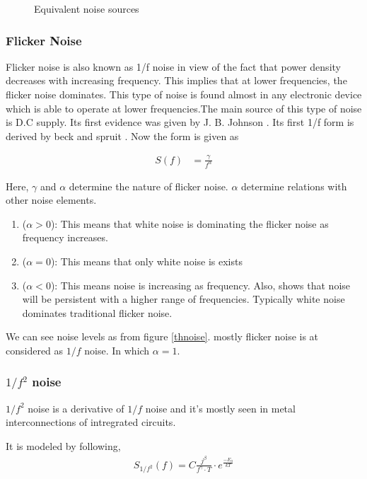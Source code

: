 \begin{figure}[hbt!]
\caption{Equivalent noise sources}
\end{figure}

\subsubsection{Flicker Noise \label{thflicker}}

Flicker noise is also known as 1/f noise in view of the fact that power density decreases with increasing frequency. This implies that at lower frequencies, the flicker noise dominates.
This type of noise is found  almost in any electronic device which is able to operate at lower frequencies.The main source of this type of noise is D.C supply. Its first evidence was given by J. B. Johnson \cite{johnson1925schottky}. Its first 1/f form is derived by beck and spruit \cite{beck19781}. Now the form is given as 

\begin{align}
S(f) & = \frac{\gamma}{f^{\alpha}}
\end{align}

Here, $\gamma$ and $\alpha$ determine the nature of flicker noise. $\alpha$ determine relations with other noise elements.

\begin{enumerate}
\item ($\alpha > 0$): This means that white noise is dominating the flicker noise as frequency increases.
\item ($\alpha = 0$): This means that only white noise is exists
\item ($\alpha < 0$): This means noise is increasing as frequency. Also, shows that noise will be persistent with a higher range of frequencies. Typically white noise dominates traditional flicker noise.
\end{enumerate}

We can see noise levels as from figure \ref{thnoise}. mostly flicker noise is at considered as $1/f$ noise. In which $\alpha = 1$.

\subsubsection{$1/f^2$ noise}
$1/f^2$ noise is a derivative of  $1/f$ noise and it's mostly seen in metal interconnections of intregrated circuits.

It is modeled by following,
\begin{align*}
  S_{1/f^2}(f) = C \frac{j^{\beta}}{f^{\gamma}\cdot T}\cdot e^{\frac{-E_a}{kT}} 
\end{align*}

